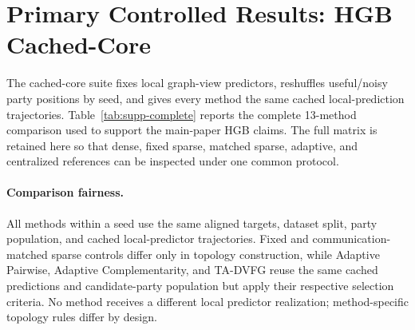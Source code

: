 \documentclass[letterpaper]{article}
\newcommand{\method}{\textsc{TA-DVFG}}
\begin{document}
\section{Primary Controlled Results: HGB Cached-Core}

The cached-core suite fixes local graph-view predictors, reshuffles useful/noisy
party positions by seed, and gives every method the same cached local-prediction
trajectories. Table~\ref{tab:supp-complete} reports the complete 13-method
comparison used to support the main-paper HGB claims. The full matrix is
retained here so that dense, fixed sparse, matched sparse, adaptive, and
centralized references can be inspected under one common protocol.

\paragraph{Comparison fairness.}
All methods within a seed use the same aligned targets, dataset split, party
population, and cached local-predictor trajectories. Fixed and
communication-matched sparse controls differ only in topology construction,
while Adaptive Pairwise, Adaptive Complementarity, and \method{} reuse the same
cached predictions and candidate-party population but apply their respective
selection criteria. No method receives a different local predictor realization;
method-specific topology rules differ by design.
\end{document}
